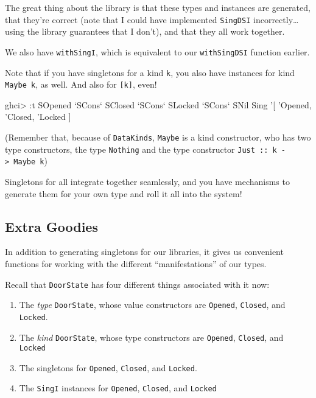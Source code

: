 \documentclass[]{article}
\newenvironment{Shaded}{}{}
\newcommand{\DataTypeTok}[1]{\textcolor[rgb]{0.56,0.13,0.00}{#1}}
\newcommand{\CharTok}[1]{\textcolor[rgb]{0.25,0.44,0.63}{#1}}
\newcommand{\OtherTok}[1]{\textcolor[rgb]{0.00,0.44,0.13}{#1}}
\newcommand{\FunctionTok}[1]{\textcolor[rgb]{0.02,0.16,0.49}{#1}}
\newcommand{\NormalTok}[1]{#1}
\begin{document}
The great thing about the library is that these types and instances are
generated, that they're correct (note that I could have implemented
\texttt{SingDSI} incorrectly\ldots{}using the library guarantees that I don't),
and that they all work together.

We also have \texttt{withSingI}, which is equivalent to our \texttt{withSingDSI}
function earlier.

Note that if you have singletons for a kind \texttt{k}, you also have instances
for kind \texttt{Maybe\ k}, as well. And also for \texttt{{[}k{]}}, even!

\begin{Shaded}
\begin{Highlighting}[]
\NormalTok{ghci}\FunctionTok{>} \FunctionTok{:}\NormalTok{t }\DataTypeTok{SOpened} \OtherTok{`SCons`} \DataTypeTok{SClosed} \OtherTok{`SCons`} \DataTypeTok{SLocked} \OtherTok{`SCons`} \DataTypeTok{SNil}
\DataTypeTok{Sing} \CharTok{'[ '}\DataTypeTok{Opened}\NormalTok{, }\CharTok{'Closed, '}\DataTypeTok{Locked}\NormalTok{ ]}
\end{Highlighting}
\end{Shaded}

(Remember that, because of \texttt{DataKinds}, \texttt{Maybe} is a kind
constructor, who has two type constructors, the type
\texttt{\textquotesingle{}Nothing} and the type constructor
\texttt{\textquotesingle{}Just\ ::\ k\ -\textgreater{}\ Maybe\ k})

Singletons for all integrate together seamlessly, and you have mechanisms to
generate them for your own type and roll it all into the system!

\subsection{Extra Goodies}\label{extra-goodies}

In addition to generating singletons for our libraries, it gives us convenient
functions for working with the different ``manifestations'' of our types.

Recall that \texttt{DoorState} has four different things associated with it now:

\begin{enumerate}
\def\labelenumi{\arabic{enumi}.}
\tightlist
\item
  The \emph{type} \texttt{DoorState}, whose value constructors are
  \texttt{Opened}, \texttt{Closed}, and \texttt{Locked}.
\item
  The \emph{kind} \texttt{DoorState}, whose type constructors are
  \texttt{\textquotesingle{}Opened}, \texttt{\textquotesingle{}Closed}, and
  \texttt{\textquotesingle{}Locked}
\item
  The singletons for \texttt{\textquotesingle{}Opened},
  \texttt{\textquotesingle{}Closed}, and \texttt{\textquotesingle{}Locked}.
\item
  The \texttt{SingI} instances for \texttt{\textquotesingle{}Opened},
  \texttt{\textquotesingle{}Closed}, and
  \texttt{\textquotesingle{}Locked\textquotesingle{}}
\end{enumerate}
\end{document}
